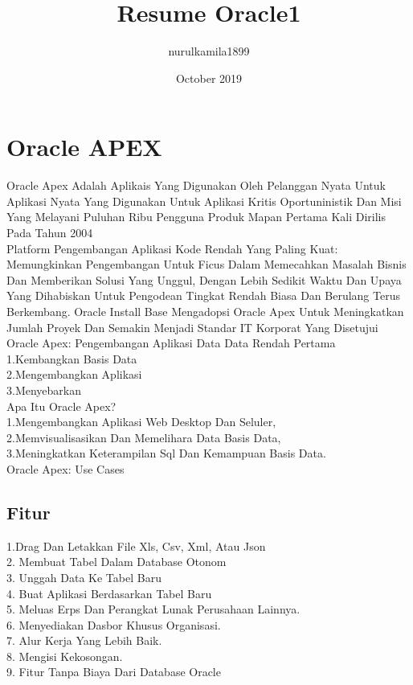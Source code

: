 \documentclass{article}
\title{Resume Oracle1}
\author{nurulkamila1899 }
\date{October 2019}
\begin{document}
\maketitle

\section{Oracle APEX}
Oracle Apex Adalah Aplikais Yang Digunakan Oleh Pelanggan Nyata Untuk Aplikasi Nyata Yang Digunakan Untuk Aplikasi Kritis Oportuninistik Dan Misi Yang Melayani Puluhan Ribu Pengguna
Produk Mapan Pertama Kali Dirilis Pada Tahun 2004\\

Platform Pengembangan Aplikasi Kode Rendah Yang Paling Kuat: Memungkinkan Pengembangan Untuk Ficus Dalam Memecahkan Masalah Bisnis Dan Memberikan Solusi Yang Unggul, Dengan Lebih Sedikit Waktu Dan Upaya Yang Dihabiskan Untuk Pengodean Tingkat Rendah Biasa Dan Berulang
Terus Berkembang. Oracle Install Base Mengadopsi Oracle Apex Untuk Meningkatkan Jumlah Proyek Dan Semakin Menjadi Standar IT Korporat Yang Disetujui\\

Oracle Apex: Pengembangan Aplikasi Data Data Rendah Pertama\\
1.Kembangkan Basis Data\\
2.Mengembangkan Aplikasi\\
3.Menyebarkan\\

	Apa Itu Oracle Apex?\\
1.Mengembangkan Aplikasi Web Desktop Dan Seluler, \\
2.Memvisualisasikan Dan Memelihara Data Basis Data, \\
3.Meningkatkan Keterampilan Sql Dan Kemampuan Basis Data.\\

Oracle Apex: Use Cases\\
\subsection{	Fitur}
1.Drag Dan Letakkan File Xls, Csv, Xml, Atau Json\\
2. Membuat Tabel Dalam Database Otonom\\
3. Unggah Data Ke Tabel Baru\\
4. Buat Aplikasi Berdasarkan Tabel Baru\\
5.	Meluas Erps Dan Perangkat Lunak Perusahaan Lainnya.\\
6.	Menyediakan Dasbor Khusus Organisasi.\\
7.	Alur Kerja Yang Lebih Baik.\\
8.	Mengisi Kekosongan.\\
9.	Fitur Tanpa Biaya Dari Database Oracle\\
\end{document}
